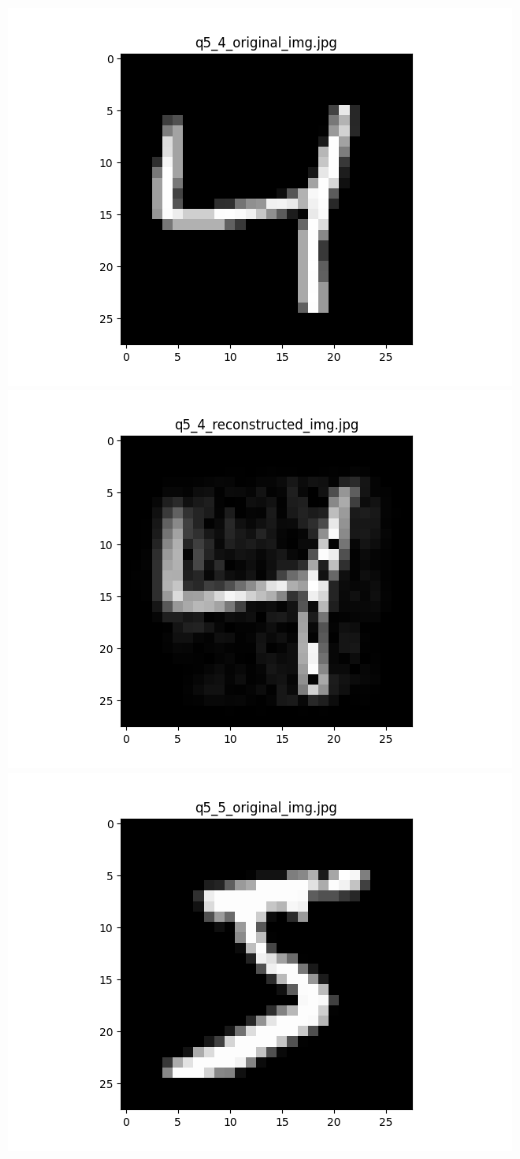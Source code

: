 \documentclass{article}
\begin{document}
    \\
    \includegraphics[scale=.6]{../results/q5/original/q5_4_original.png}
    \includegraphics[scale=.6]{../results/q5/reconstrcuted/q5_4_reconstructed.png}
    \\
    \includegraphics[scale=.6]{../results/q5/original/q5_5_original.png}
\end{document}
